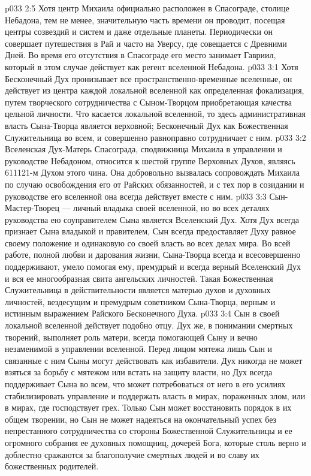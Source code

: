 \vs p033 2:5 \pc Хотя центр Михаила официально расположен в Спасограде, столице Небадона, тем не менее, значительную часть времени он проводит, посещая центры созвездий и систем и даже отдельные планеты. Периодически он совершает путешествия в Рай и часто на Уверсу, где совещается с Древними Дней. Во время его отсутствия в Спасограде его место занимает Гавриил, который в этом случае действует как регент вселенной Небадона.
\vs p033 3:1 Хотя Бесконечный Дух пронизывает все пространственно\hyp{}временные вселенные, он действует из центра каждой локальной вселенной как определенная фокализация, путем творческого сотрудничества с Сыном\hyp{}Творцом приобретающая качества цельной личности. Что касается локальной вселенной, то здесь административная власть Сына\hyp{}Творца является верховной; Бесконечный Дух как Божественная Служительница во всем, и совершенно равноправно сотрудничает с ним.
\vs p033 3:2 \pc Вселенская Дух\hyp{}Матерь Спасограда, сподвижница Михаила в управлении и руководстве Небадоном, относится к шестой группе Верховных Духов, являясь 611121\hyp{}м Духом этого чина. Она добровольно вызвалась сопровождать Михаила по случаю освобождения его от Райских обязанностей, и с тех пор в созидании и руководстве его вселенной она всегда действует вместе с ним.
\vs p033 3:3 \pc Сын\hyp{}Мастер\hyp{}Творец --- личный владыка своей вселенной, но во всех деталях руководства ею соуправителем Сына является Вселенский Дух. Хотя Дух всегда признает Сына владыкой и правителем, Сын всегда предоставляет Духу равное своему положение и одинаковую со своей власть во всех делах мира. Во всей работе, полной любви и дарования жизни, Сына\hyp{}Творца всегда и всесовершенно поддерживают, умело помогая ему, премудрый и всегда верный Вселенский Дух и вся ее многообразная свита ангельских личностей. Такая Божественная Служительница в действительности является матерью духов и духовных личностей, вездесущим и премудрым советником Сына\hyp{}Творца, верным и истинным выражением Райского Бесконечного Духа.
\vs p033 3:4 \pc Сын в своей локальной вселенной действует подобно отцу. Дух же, в понимании смертных творений, выполняет роль матери, всегда помогающей Сыну и вечно незаменимой в управлении вселенной. Перед лицом мятежа лишь Сын и связанные с ним Сыны могут действовать как избавители. Дух никогда не может взяться за борьбу с мятежом или встать на защиту власти, но Дух всегда поддерживает Сына во всем, что может потребоваться от него в его усилиях стабилизировать управление и поддержать власть в мирах, пораженных злом, или в мирах, где господствует грех. Только Сын может восстановить порядок в их общем творении, но Сын не может надеяться на окончательный успех без непрестанного сотрудничества со стороны Божественной Служительницы и ее огромного собрания ее духовных помощниц, дочерей Бога, которые столь верно и доблестно сражаются за благополучие смертных людей и во славу их божественных родителей.
